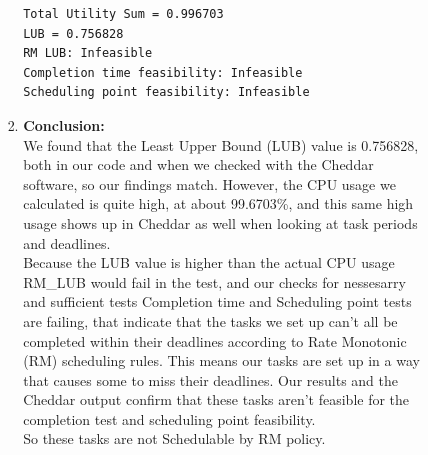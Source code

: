 \documentclass[a4paper,11pt]{article}%
\newenvironment{qanda}{\setlength{\parindent}{0pt}}{\bigskip}
\begin{document}
\begin{qanda}
\begin{enumerate}
\begin{enumerate}
\begin{enumerate}
\begin{enumerate}
\begin{verbatim}
Total Utility Sum = 0.996703
LUB = 0.756828
RM LUB: Infeasible
Completion time feasibility: Infeasible
Scheduling point feasibility: Infeasible
										\end{verbatim}
						            \item \textbf{Conclusion:}\\
						                  We found that the Least Upper Bound (LUB) value is 0.756828, both in our code and when we checked with the Cheddar software, so our findings match. However, the CPU usage we calculated is quite high, at about 99.6703\%, and this same high usage shows up in Cheddar as well when looking at task periods and deadlines.\\

						                  Because the LUB value is higher than the actual CPU usage RM\_LUB would fail in the test, and our checks for nessesarry and sufficient tests Completion time and Scheduling point tests are failing, that indicate that the tasks we set up can't all be completed within their deadlines according to Rate Monotonic (RM) scheduling rules. This means our tasks are set up in a way that causes some to miss their deadlines. Our results and the Cheddar output confirm that these tasks aren't feasible for the completion test and scheduling point feasibility.\\

						                  So these tasks are not Schedulable by RM policy.



\end{enumerate}
\end{enumerate}
\end{enumerate}
\end{enumerate}
\end{qanda}
\end{document}

